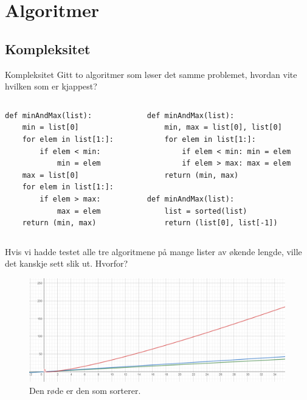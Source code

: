 \section{Algoritmer}

\subsection{Kompleksitet}
\begin{frame}[fragile]{Kompleksitet}
    Gitt to algoritmer som løser det samme problemet, hvordan vite hvilken som er kjappest?
    \begin{columns}
        \begin{column}{0.45\textwidth}
            \begin{verbatim}
def minAndMax(list):
    min = list[0]
    for elem in list[1:]:
        if elem < min:
            min = elem
    max = list[0]
    for elem in list[1:]:
        if elem > max:
            max = elem
    return (min, max)
            \end{verbatim}
        \end{column}
        \pause
        \begin{column}{0.45\textwidth}
            \begin{verbatim}
def minAndMax(list):
    min, max = list[0], list[0]
    for elem in list[1:]:
        if elem < min: min = elem
        if elem > max: max = elem
    return (min, max)
    
def minAndMax(list):
    list = sorted(list)
    return (list[0], list[-1])
            \end{verbatim}
        \end{column}
    \end{columns}    
\end{frame}
\begin{frame}[fragile]{}
    Hvis vi hadde testet alle tre algoritmene på mange lister av økende lengde, ville det kanskje sett slik ut. Hvorfor?
    \begin{figure}
        \centering
        \includegraphics[height = 4.5cm]{images/minmax.png}
        \caption{Den røde er den som sorterer.}
        \label{fig:minmax}
    \end{figure}    
\end{frame}

